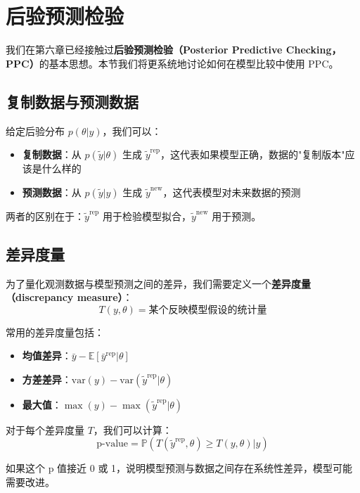 \section{后验预测检验}

我们在第六章已经接触过\textbf{后验预测检验（Posterior Predictive Checking，PPC）}的基本思想。本节我们将更系统地讨论如何在模型比较中使用 PPC。

\subsection{复制数据与预测数据}

给定后验分布 $p(\theta | y)$，我们可以：

\begin{itemize}
  \item \textbf{复制数据}：从 $p(\tilde{y} | \theta)$ 生成 $\tilde{y}^{\text{rep}}$，这代表如果模型正确，数据的"复制版本"应该是什么样的
  \item \textbf{预测数据}：从 $p(\tilde{y} | y)$ 生成 $\tilde{y}^{\text{new}}$，这代表模型对未来数据的预测
\end{itemize}

两者的区别在于：$\tilde{y}^{\text{rep}}$ 用于检验模型拟合，$\tilde{y}^{\text{new}}$ 用于预测。

\subsection{差异度量}

为了量化观测数据与模型预测之间的差异，我们需要定义一个\textbf{差异度量（discrepancy measure）}：
\[
T(y, \theta) = \text{某个反映模型假设的统计量}
\]

常用的差异度量包括：

\begin{itemize}
  \item \textbf{均值差异}：$\bar{y} - \mathbb{E}[\bar{y}^{\text{rep}} | \theta]$
  \item \textbf{方差差异}：$\text{var}(y) - \text{var}(\tilde{y}^{\text{rep}} | \theta)$
  \item \textbf{最大值}：$\max(y) - \max(\tilde{y}^{\text{rep}} | \theta)$
\end{itemize}

对于每个差异度量 $T$，我们可以计算：
\[
\text{p-value} = \mathbb{P}(T(\tilde{y}^{\text{rep}}, \theta) \geq T(y, \theta) | y)
\]

如果这个 p 值接近 0 或 1，说明模型预测与数据之间存在系统性差异，模型可能需要改进。

